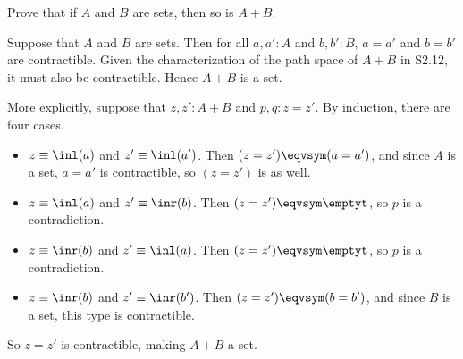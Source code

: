 Prove that if $A$ and $B$ are sets, then so is $A + B$.


 \soln
Suppose that $A$ and $B$ are sets.  Then for all $a, a' : A$ and $b, b': B$, $a
= a'$ and $b = b'$ are contractible.  Given the characterization of the path
space of $A+B$ in S2.12, it must also be contractible.  Hence $A + B$ is a
set.


More explicitly, suppose that $z, z' : A + B$ and $p, q : z = z'$.  By
induction, there are four cases.



\begin{itemize}
\item  $z \equiv \inl(a)$ and $z' \equiv \inl(a')$.  Then $(z = z') \eqvsym (a = a')$, and since $A$ is a set, $a = a'$ is contractible, so $(z = z')$ is as well.

\item  $z \equiv \inl(a)$ and $z' \equiv \inr(b)$.  Then $(z = z') \eqvsym \emptyt$, so $p$ is a contradiction.

\item  $z \equiv \inr(b)$ and $z' \equiv \inl(a)$.  Then $(z = z') \eqvsym \emptyt$, so $p$ is a contradiction.

\item  $z \equiv \inr(b)$ and $z' \equiv \inr(b')$.  Then $(z = z') \eqvsym (b = b')$, and since $B$ is a set, this type is contractible.

\end{itemize}
So $z = z'$ is contractible, making $A + B$ a set.
